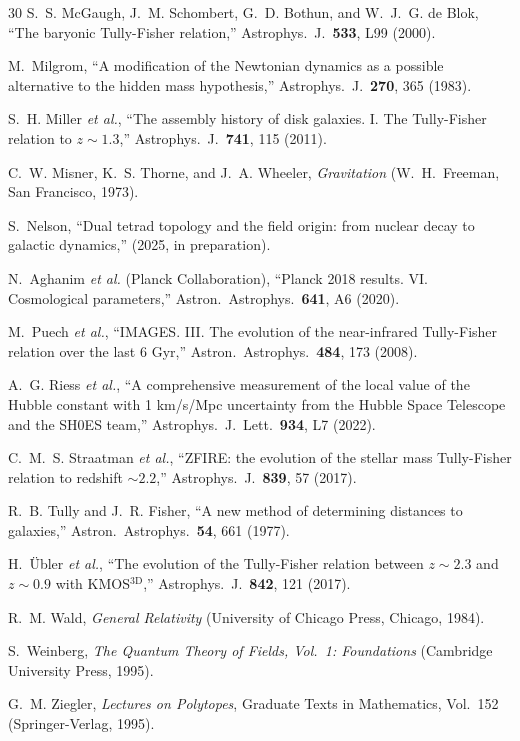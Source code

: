 \documentclass[aps,prd,preprint,superscriptaddress,showpacs,preprintnumbers,amsmath,amssymb,nofootinbib]{revtex4-2}
\begin{document}
\begin{thebibliography}{30}
S.~S. McGaugh, J.~M. Schombert, G.~D. Bothun, and W.~J.~G. de Blok, ``The baryonic Tully-Fisher relation,'' Astrophys.\ J.\ \textbf{533}, L99 (2000).

M.~Milgrom, ``A modification of the Newtonian dynamics as a possible alternative to the hidden mass hypothesis,'' Astrophys.\ J.\ \textbf{270}, 365 (1983).

S.~H. Miller \textit{et al.}, ``The assembly history of disk galaxies. I. The Tully-Fisher relation to $z \sim 1.3$,'' Astrophys.\ J.\ \textbf{741}, 115 (2011).

C.~W. Misner, K.~S. Thorne, and J.~A. Wheeler, \emph{Gravitation} (W.~H.~Freeman, San Francisco, 1973).

S.~Nelson, ``Dual tetrad topology and the field origin: from nuclear decay to galactic dynamics,'' (2025, in preparation).

N.~Aghanim \textit{et al.} (Planck Collaboration), ``Planck 2018 results. VI. Cosmological parameters,'' Astron.\ Astrophys.\ \textbf{641}, A6 (2020).

M.~Puech \textit{et al.}, ``IMAGES. III. The evolution of the near-infrared Tully-Fisher relation over the last 6 Gyr,'' Astron.\ Astrophys.\ \textbf{484}, 173 (2008).

A.~G. Riess \textit{et al.}, ``A comprehensive measurement of the local value of the Hubble constant with 1 km/s/Mpc uncertainty from the Hubble Space Telescope and the SH0ES team,'' Astrophys.\ J.\ Lett.\ \textbf{934}, L7 (2022).

C.~M.~S. Straatman \textit{et al.}, ``ZFIRE: the evolution of the stellar mass Tully-Fisher relation to redshift $\sim 2.2$,'' Astrophys.\ J.\ \textbf{839}, 57 (2017).

R.~B. Tully and J.~R. Fisher, ``A new method of determining distances to galaxies,'' Astron.\ Astrophys.\ \textbf{54}, 661 (1977).

H.~\"{U}bler \textit{et al.}, ``The evolution of the Tully-Fisher relation between $z \sim 2.3$ and $z \sim 0.9$ with KMOS$^{\mathrm{3D}}$,'' Astrophys.\ J.\ \textbf{842}, 121 (2017).

R.~M. Wald, \emph{General Relativity} (University of Chicago Press, Chicago, 1984).

S.~Weinberg, \emph{The Quantum Theory of Fields, Vol.\ 1: Foundations} (Cambridge University Press, 1995).

G.~M. Ziegler, \emph{Lectures on Polytopes}, Graduate Texts in Mathematics, Vol.~152 (Springer-Verlag, 1995).

\end{thebibliography}
\end{document}
